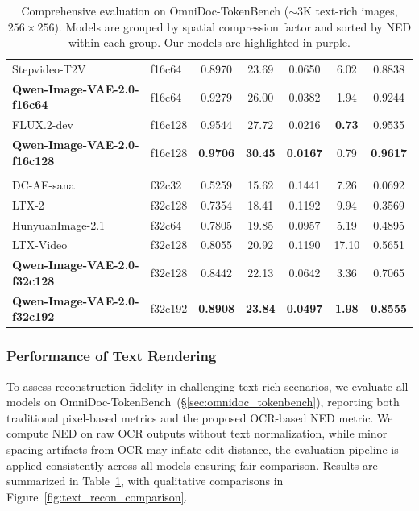 \documentclass{llmxive}
\begin{document}
\begin{table}[t]
{\begin{tabular}{llccccc}
Stepvideo-T2V~\citep{stepvideo}             & f16c64    & 0.8970 & 23.69 & 0.0650 & 6.02  & 0.8838 \\
\rowcolor{blue!5} \textbf{Qwen-Image-VAE-2.0-f16c64}      & f16c64   & 0.9279 & 26.00 & 0.0382 & 1.94  & 0.9244 \\
FLUX.2-dev~\citep{flux2}                & f16c128   & 0.9544 & 27.72 & 0.0216 & \textbf{0.73}  & 0.9535 \\
\rowcolor{blue!5} \textbf{Qwen-Image-VAE-2.0-f16c128}     & f16c128  & \textbf{0.9706} & \textbf{30.45} & \textbf{0.0167} & 0.79 & \textbf{0.9617} \\
\midrule
\rowcolor{gray!8} \multicolumn{7}{l}{\textit{f32 Compression VAEs}} \\
DC-AE-sana~\citep{dcae}                 & f32c32    & 0.5259 & 15.62 & 0.1441 & 7.26  & 0.0692 \\
LTX-2~\citep{ltx2}                     & f32c128   & 0.7354 & 18.41 & 0.1192 & 9.94  & 0.3569 \\
HunyuanImage-2.1~\citep{hunyuanimage2.1}          & f32c64    & 0.7805 & 19.85 & 0.0957 & 5.19  & 0.4895 \\
LTX-Video~\citep{ltx}                     & f32c128   & 0.8055 & 20.92 & 0.1190 & 17.10 & 0.5651 \\
\rowcolor{blue!5} \textbf{Qwen-Image-VAE-2.0-f32c128}     & f32c128  & 0.8442 & 22.13 & 0.0642 & 3.36  & 0.7065 \\
\rowcolor{blue!5} \textbf{Qwen-Image-VAE-2.0-f32c192}     & f32c192  & \textbf{0.8908} & \textbf{23.84} & \textbf{0.0497} & \textbf{1.98} & \textbf{0.8555} \\
\bottomrule
\end{tabular}
}
\caption{Comprehensive evaluation on OmniDoc-TokenBench (${\sim}$3K text-rich images, $256\!\times\!256$). Models are grouped by spatial compression factor and sorted by NED within each group. Our models are highlighted in \colorbox{blue!5}{purple}. }
\label{tab:text_bench}
\end{table}


\subsubsection{Performance of Text Rendering}
\label{sec:text_rendering}

To assess reconstruction fidelity in challenging text-rich scenarios, we evaluate all models on OmniDoc-TokenBench~(\S\ref{sec:omnidoc_tokenbench}), reporting both traditional pixel-based metrics and the proposed OCR-based NED metric. We compute NED on raw OCR outputs without text normalization, while minor spacing artifacts from OCR may inflate edit distance, the evaluation pipeline is applied consistently across all models ensuring fair comparison. Results are summarized in Table~\ref{tab:text_bench}, with qualitative comparisons in Figure~\ref{fig:text_recon_comparison}.
\end{document}

